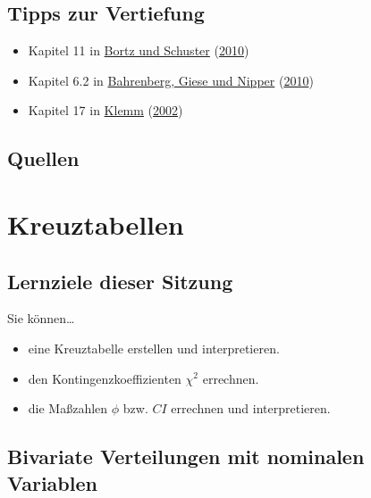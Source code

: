 \documentclass[
  ngerman,
]{article}
\providecommand{\tightlist}{%
  \setlength{\itemsep}{0pt}\setlength{\parskip}{0pt}}
\begin{document}
\hypertarget{tipps-zur-vertiefung-7}{%
\subsection{Tipps zur Vertiefung}\label{tipps-zur-vertiefung-7}}

\begin{itemize}
\tightlist
\item
  Kapitel 11 in \protect\hyperlink{ref-bortz}{Bortz und Schuster} (\protect\hyperlink{ref-bortz}{2010})
\item
  Kapitel 6.2 in \protect\hyperlink{ref-bahrenberg}{Bahrenberg, Giese und Nipper} (\protect\hyperlink{ref-bahrenberg}{2010})
\item
  Kapitel 17 in \protect\hyperlink{ref-klemm}{Klemm} (\protect\hyperlink{ref-klemm}{2002})
\end{itemize}

\hypertarget{quellen-7}{%
\subsection{Quellen}\label{quellen-7}}

\hypertarget{kreuztabellen}{%
\section{Kreuztabellen}\label{kreuztabellen}}

\hypertarget{lernziele-dieser-sitzung-8}{%
\subsection{Lernziele dieser Sitzung}\label{lernziele-dieser-sitzung-8}}

Sie können\ldots{}

\begin{itemize}
\tightlist
\item
  eine Kreuztabelle erstellen und interpretieren.
\item
  den Kontingenzkoeffizienten \(\chi^2\) errechnen.
\item
  die Maßzahlen \(\phi\) bzw. \(\mathit{CI}\) errechnen und interpretieren.
\end{itemize}

\hypertarget{bivariate-verteilungen-mit-nominalen-variablen}{%
\subsection{Bivariate Verteilungen mit nominalen Variablen}\label{bivariate-verteilungen-mit-nominalen-variablen}}
\end{document}
